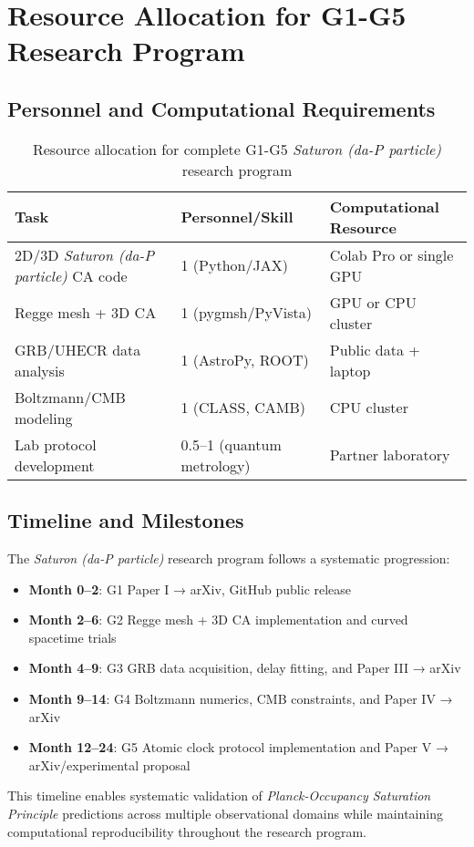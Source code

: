 \documentclass[twocolumn,showpacs,preprintnumbers,amsmath,amssymb,prb]{revtex4-2}
\newcommand{\saturon}{\textit{Saturon (da-P particle)}}
\newcommand{\posp}{\textit{Planck-Occupancy Saturation Principle}}
\begin{document}
\section{Resource Allocation for G1-G5 Research Program}
\label{app:resources}

\subsection{Personnel and Computational Requirements}

\begin{table}[h]
\centering
\begin{tabular}{lll}
\toprule
Task & Personnel/Skill & Computational Resource \\
\midrule
2D/3D \saturon{} CA code & 1 (Python/JAX) & Colab Pro or single GPU \\
Regge mesh + 3D CA & 1 (pygmsh/PyVista) & GPU or CPU cluster \\
GRB/UHECR data analysis & 1 (AstroPy, ROOT) & Public data + laptop \\
Boltzmann/CMB modeling & 1 (CLASS, CAMB) & CPU cluster \\
Lab protocol development & 0.5–1 (quantum metrology) & Partner laboratory \\
\bottomrule
\end{tabular}
\caption{Resource allocation for complete G1-G5 \saturon{} research program}
\label{tab:resources}
\end{table}

\subsection{Timeline and Milestones}

The \saturon{} research program follows a systematic progression:
\begin{itemize}
\item \textbf{Month 0–2}: G1 Paper I → arXiv, GitHub public release
\item \textbf{Month 2–6}: G2 Regge mesh + 3D CA implementation and curved spacetime trials
\item \textbf{Month 4–9}: G3 GRB data acquisition, delay fitting, and Paper III → arXiv
\item \textbf{Month 9–14}: G4 Boltzmann numerics, CMB constraints, and Paper IV → arXiv
\item \textbf{Month 12–24}: G5 Atomic clock protocol implementation and Paper V → arXiv/experimental proposal
\end{itemize}

This timeline enables systematic validation of \posp{} predictions across multiple observational domains while maintaining computational reproducibility throughout the research program.
\end{document}

